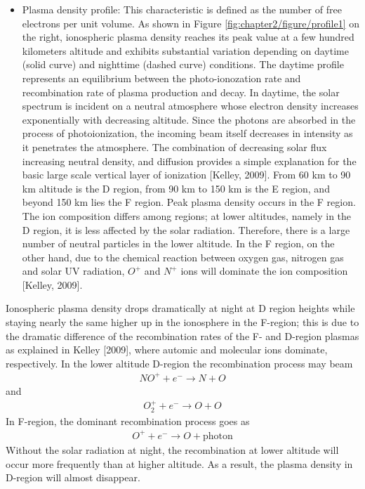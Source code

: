 \begin{itemize}
    \item Plasma density profile: This characteristic is defined as the number of free electrons per unit volume. As shown in Figure \ref{fig:chapter2/figure/profile1} on the right, ionospheric plasma density reaches its peak value at a few hundred kilometers altitude and exhibits substantial variation depending on daytime (solid curve) and nighttime (dashed curve) conditions. The daytime profile represents an equilibrium between the photo-ionozation rate and recombination rate of plasma production and decay. In daytime, the solar spectrum is incident on a neutral atmosphere whose electron density increases exponentially with decreasing altitude. Since the photons are absorbed in the process of photoionization, the incoming beam itself decreases in intensity as it penetrates the atmosphere. The combination of decreasing solar flux increasing neutral density, and diffusion provides a simple explanation for the basic large scale vertical layer of ionization [Kelley, 2009]. From 60 km to 90 km altitude is the D region, from 90 km to 150 km is the E region, and beyond 150 km lies the F region. Peak plasma density occurs in the F region. The ion composition differs among regions; at lower altitudes, namely in the D region, it is less affected by the solar radiation. Therefore, there is a large number of neutral particles in the lower altitude. In the F region, on the other hand, due to the chemical reaction between oxygen gas, nitrogen gas and solar UV radiation, $O^+$ and $N^+$ ions will dominate the ion composition [Kelley, 2009].
\end{itemize}

Ionospheric plasma density drops dramatically at night at D region heights while staying nearly the same higher up in the ionosphere in the F-region; this is due to the dramatic difference of the recombination rates of the F- and D-region plasmas as explained in Kelley [2009], where automic and molecular ions dominate, respectively. In the lower altitude D-region the recombination process may beam
\begin{align*}
    NO^+ + e^- \rightarrow N+O
\end{align*}
and 
\begin{align*}
    O_2^+ + e^- \rightarrow O+O
\end{align*}
In F-region, the dominant recombination process goes as
\begin{align*}
    O^++e^-\rightarrow O+\mbox{photon}
\end{align*}
Without the solar radiation at night, the recombination at lower altitude will occur more frequently than at higher altitude. As a result, the plasma density in D-region will almost disappear.



